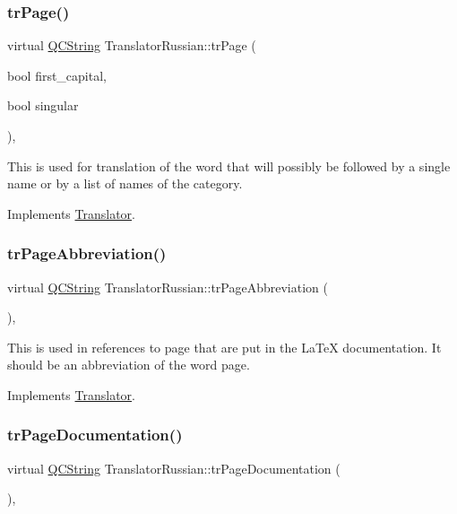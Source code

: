\subsubsection{\texorpdfstring{trPage()}{trPage()}}
{\footnotesize\ttfamily virtual \mbox{\hyperlink{class_q_c_string}{Q\+C\+String}} Translator\+Russian\+::tr\+Page (\begin{DoxyParamCaption}\item[{bool}]{first\+\_\+capital,  }\item[{bool}]{singular }\end{DoxyParamCaption})\hspace{0.3cm}{\ttfamily [inline]}, {\ttfamily [virtual]}}

This is used for translation of the word that will possibly be followed by a single name or by a list of names of the category. 

Implements \mbox{\hyperlink{class_translator}{Translator}}.

\mbox{\label{class_translator_russian_a6d744c42a5734cb01fee950edcdc3ee0}} 
\subsubsection{\texorpdfstring{trPageAbbreviation()}{trPageAbbreviation()}}
{\footnotesize\ttfamily virtual \mbox{\hyperlink{class_q_c_string}{Q\+C\+String}} Translator\+Russian\+::tr\+Page\+Abbreviation (\begin{DoxyParamCaption}{ }\end{DoxyParamCaption})\hspace{0.3cm}{\ttfamily [inline]}, {\ttfamily [virtual]}}

This is used in references to page that are put in the La\+TeX documentation. It should be an abbreviation of the word page. 

Implements \mbox{\hyperlink{class_translator}{Translator}}.

\mbox{\label{class_translator_russian_a8bd72a35cecc04d607524425f5d80a26}} 
\subsubsection{\texorpdfstring{trPageDocumentation()}{trPageDocumentation()}}
{\footnotesize\ttfamily virtual \mbox{\hyperlink{class_q_c_string}{Q\+C\+String}} Translator\+Russian\+::tr\+Page\+Documentation (\begin{DoxyParamCaption}{ }\end{DoxyParamCaption})\hspace{0.3cm}{\ttfamily [inline]}, {\ttfamily [virtual]}}

